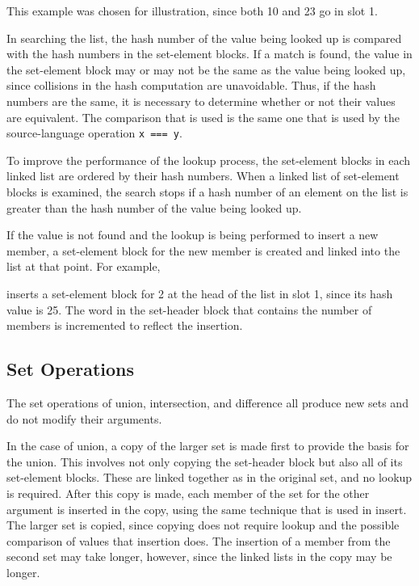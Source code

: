 This example was chosen for illustration, since both 10 and 23 go in slot 1.

In searching the list, the hash number of the value being looked up is
compared with the hash numbers in the set-element blocks. If a match
is found, the value in the set-element block may or may not be the same
as the value being looked up, since collisions in the hash computation
are unavoidable. Thus, if the hash numbers are the same, it is
necessary to determine whether or not their values are equivalent. The
comparison that is used is the same one that is used by the
source-language operation \texttt{x === y}.

To improve the performance of the lookup process, the set-element
blocks in each linked list are ordered by their hash numbers. When a
linked list of set-element blocks is examined, the search stops if a
hash number of an element on the list is greater than the hash number
of the value being looked up.

If the value is not found and the lookup is being performed to insert
a new member, a set-element block for the new member is created and
linked into the list at that point. For example,


\noindent inserts a set-element block for 2 at the head of the list
in slot 1, since its hash value is 25. The word in the set-header
block that contains the number of members is incremented to reflect
the insertion.

\subsection{Set Operations}

The set operations of union, intersection, and difference all produce
new sets and do not modify their arguments.


In the case of union, a copy of the larger set is made first to
provide the basis for the union. This involves not only copying the
set-header block but also all of its set-element blocks. These are
linked together as in the original set, and no lookup is
required. After this copy is made, each member of the set for the
other argument is inserted in the copy, using the same technique that
is used in insert. The larger set is copied, since copying does not
require lookup and the possible comparison of values that insertion
does. The insertion of a member from the second set may take longer,
however, since the linked lists in the copy may be longer.

